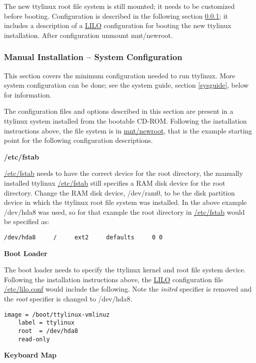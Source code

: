 \documentclass[10pt]{article}
\begin{document}
The new ttylinux root file system is still mounted; it needs to be customized
before booting. Configuration is described in the following section
\ref{configuration}; it includes a description of a \url{LILO} configuration
for booting the new ttylinux installation. After configuration unmount
mnt/newroot.

\subsubsection{Manual Installation -- System Configuration}
\label{configuration}

This section covers the minimum configuration needed to run ttylinux. More
system configuration can be done; see the system guide, section \ref{sysguide},
below for information.

The configuration files and options described in this section are present in a
ttylinux system installed from the bootable CD-ROM. Following the installation
instructions above, the file system is in \url{mnt/newroot}, that is the
example starting point for the following configuration descriptions.

{\bf /etc/fstab}

\url{/etc/fstab} needs to have the correct device for the root directory, the
manually installed ttylinux \url{/etc/fstab} still specifies a RAM disk device
for the root directory. Change the RAM disk device, /dev/ram0, to be the disk
partition device in which the ttylinux root file system was installed. In the
above example /dev/hda8 was used, so for that example the root directory in
\url{/etc/fstab} would be specified as:

\begin{lstlisting}
/dev/hda8     /     ext2     defaults     0 0
\end{lstlisting}

{\bf Boot Loader}

The boot loader needs to specify the ttylinux kernel and root file system
device. Following the installation instructions above, the \url{LILO}
configuration file \url{/etc/lilo.conf} would include the following. Note the
{\it initrd} specifier is removed and the {\it root} specifier is changed to
/dev/hda8.

\begin{lstlisting}
image = /boot/ttylinux-vmlinuz
	label = ttylinux
	root  = /dev/hda8
	read-only
\end{lstlisting}

{\bf Keyboard Map}
\end{document}
